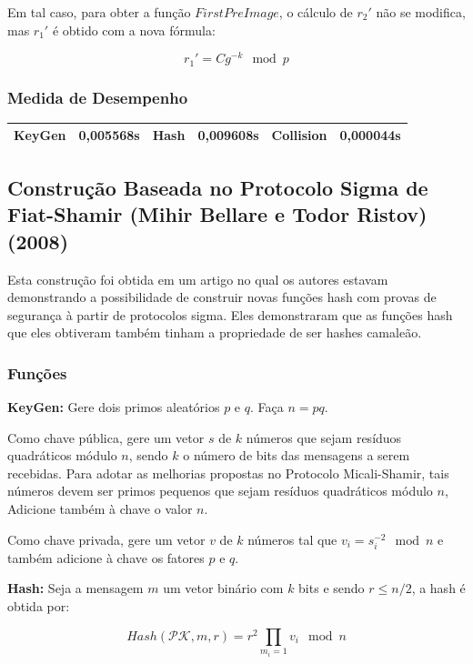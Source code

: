 \documentclass[a4paper]{article}
\begin{document}
Em tal caso, para obter a função $FirstPreImage$, o cálculo de $r_2'$
não se modifica, mas $r_1'$ é obtido com a nova fórmula:

$$
r_1'=Cg^{-k} \mod p
$$

\subsubsection{Medida de Desempenho}

\begin{center}
\begin{tabular}{|c|c|c|c|c|c|}
  \hline
  KeyGen & 0,005568s & Hash & 0,009608s & Collision & 0,000044s\\
  \hline
\end{tabular}
\end{center}

\subsection{Construção Baseada no Protocolo Sigma de Fiat-Shamir
  (Mihir Bellare e Todor Ristov) (2008)\cite{sigma}}

Esta construção foi obtida em um artigo no qual os autores estavam
demonstrando a possibilidade de construir novas funções hash com
provas de segurança à partir de protocolos sigma. Eles demonstraram
que as funções hash que eles obtiveram também tinham a propriedade de
ser hashes camaleão.

\subsubsection{Funções}

\textbf{KeyGen: } Gere dois primos aleatórios $p$ e $q$. Faça $n=pq$.

Como chave pública, gere um vetor $s$ de $k$ números que sejam
resíduos quadráticos módulo $n$, sendo $k$ o número de bits das
mensagens a serem recebidas. Para adotar as melhorias propostas no
Protocolo Micali-Shamir, tais números devem ser primos pequenos que
sejam resíduos quadráticos módulo $n$, Adicione também à chave o valor
$n$.

Como chave privada, gere um vetor $v$ de $k$ números tal que
$v_i=s_i^{-2} \mod n$ e também adicione à chave os fatores $p$ e $q$.

\textbf{Hash: } Seja a mensagem $m$ um vetor binário com $k$ bits e
sendo $r \leq n/2$, a hash é obtida por:

$$ Hash(\mathcal{PK}, m, r) = r^2\prod_{m_i=1}v_i \mod n
$$
\end{document}
